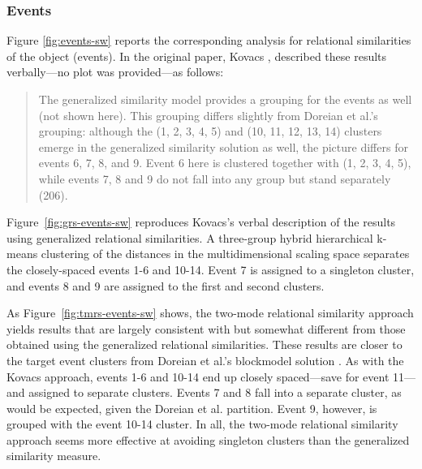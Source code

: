 \documentclass[a4paper,fleqn]{cas-sc}
\begin{document}
\subsubsection{Events}
Figure \ref{fig:events-sw} reports the corresponding analysis for relational similarities of the object (events). In the original paper, Kovacs \citeyearpar[206]{kovacs2010}, described these results verbally---no plot was provided---as follows:

\begin{quote}
The generalized similarity model provides a grouping for the events as well (not shown here). This grouping differs slightly from Doreian et al.'s \citeyearpar{doreian2004} grouping: although the (1, 2, 3, 4, 5) and (10, 11, 12, 13, 14) clusters emerge in the generalized similarity solution as well, the picture differs for events 6, 7, 8, and 9. Event 6 here is clustered together with (1, 2, 3, 4, 5), while events 7, 8 and 9 do not fall into any group but stand separately  (206). 
\end{quote}

Figure~\ref{fig:grs-events-sw} reproduces Kovacs's verbal description of the results using generalized relational similarities. A three-group hybrid hierarchical k-means clustering of the distances in the multidimensional scaling space separates the closely-spaced events 1-6 and 10-14. Event 7 is assigned to a singleton cluster, and events 8 and 9 are assigned to the first and second clusters. 

As Figure~\ref{fig:tmrs-events-sw} shows, the two-mode relational similarity approach yields results that are largely consistent with but somewhat different from those obtained using the generalized relational similarities. These results are closer to the target event clusters from Doreian et al.'s blockmodel solution \citeyearpar{doreian2004}. As with the Kovacs approach, events 1-6 and 10-14 end up closely spaced---save for event 11---and assigned to separate clusters. Events 7 and 8 fall into a separate cluster, as would be expected, given the Doreian et al. partition. Event 9, however, is grouped with the event 10-14 cluster. In all, the two-mode relational similarity approach seems more effective at avoiding singleton clusters than the generalized similarity measure. 
\end{document}
